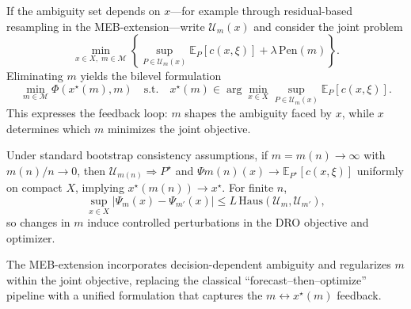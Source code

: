 \documentclass{itor}
\begin{document}
If the ambiguity set depends on $x$—for example through residual-based resampling in the MEB-extension—write $\mathcal{U}_m(x)$ and consider the joint problem
\begin{equation}
	\min_{x\in X,\; m\in\mathcal{M}}
	\left\{
	\sup_{P\in\mathcal{U}_m(x)} \mathbb{E}_P[c(x,\xi)]
	+ \lambda\,\mathrm{Pen}(m)
	\right\}.
\end{equation}
Eliminating $m$ yields the bilevel formulation
\begin{equation}
	\min_{m\in\mathcal{M}} 
	\Phi(x^\star(m),m)
	\quad\text{s.t.}\quad
	x^\star(m)\in\arg\min_{x\in X}
	\sup_{P\in\mathcal{U}_m(x)}\mathbb{E}_P[c(x,\xi)].
\end{equation}
This expresses the feedback loop: $m$ shapes the ambiguity faced by $x$, while $x$ determines which $m$ minimizes the joint objective.

Under standard bootstrap consistency assumptions, if $m=m(n)\to\infty$ with $m(n)/n\to 0$, then $\mathcal{U}_{m(n)}\Rightarrow P^\star$ and $\Psi{m(n)}(x)\to\mathbb{E}_{P^\star}[c(x,\xi)]$ uniformly on compact $X$, implying $x^\star(m(n))\to x^\star$. For finite $n$,
\begin{equation}
	\sup_{x\in X}\big|\Psi_m(x)-\Psi_{m'}(x)\big|
	\le 
	L\,\mathrm{Haus}\!\left(\mathcal{U}_m,\mathcal{U}_{m'}\right),
\end{equation}
so changes in $m$ induce controlled perturbations in the DRO objective and optimizer.

The MEB-extension incorporates decision-dependent ambiguity and regularizes $m$ within the joint objective, replacing the classical ``forecast--then--optimize'' pipeline with a unified formulation that captures the $m\leftrightarrow x^\star(m)$ feedback.

%		
%		
%		
%		
%		
\end{document}
